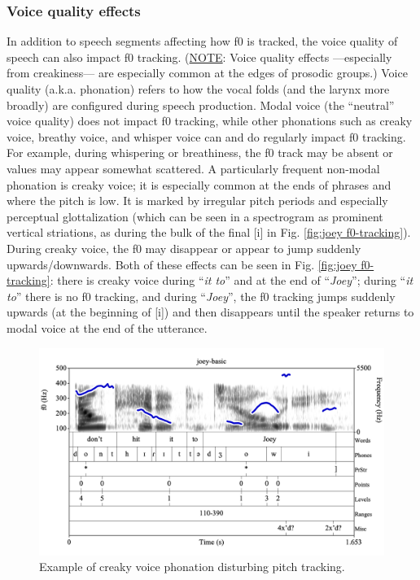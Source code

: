 \documentclass[11pt, twoside]{memoir}
\def\langtext#1{\textit{#1}}
\begin{document}
{{{\subsubsection{Voice quality effects}\label{sec:voice-quality-effects}
In addition to speech segments affecting how f0 is tracked, the voice quality of speech can also impact f0 tracking. (\uline{NOTE}: Voice quality effects —especially from creakiness— are especially common at the edges of prosodic groups.) Voice quality (a.k.a. phonation) refers to how the vocal folds (and the larynx more broadly) are configured during speech production. Modal voice (the “neutral” voice quality) does not impact f0 tracking, while other phonations such as creaky voice, breathy voice, and whisper voice can and do regularly impact f0 tracking. For example, during whispering or breathiness, the f0 track may be absent or values may appear somewhat scattered. 
A particularly frequent non-modal phonation is creaky voice; it is especially common at the ends of phrases and where the pitch is low. It is marked by irregular pitch periods and especially perceptual glottalization (which can be seen in a spectrogram as prominent vertical striations, as during the bulk of the final [i] in Fig. \ref{fig:joey f0-tracking}). During creaky voice, the f0 may disappear or appear to jump suddenly upwards\slash downwards. Both of these effects can be seen in Fig. \ref{fig:joey f0-tracking}: there is creaky voice during “\langtext{it to}” and at the end of “\langtext{Joey}”; during “\langtext{it to}” there is no f0 tracking, and during “\langtext{Joey}”, the f0 tracking jumps suddenly upwards (at the beginning of [i]) and then disappears until the speaker returns to modal voice at the end of the utterance.
\begin{figure}[H]
\centering
\includegraphics[width=.875\linewidth]{Appendix-joey.png}
\caption{Example of creaky voice phonation disturbing pitch tracking.
}
\end{figure}}}}
\end{document}
